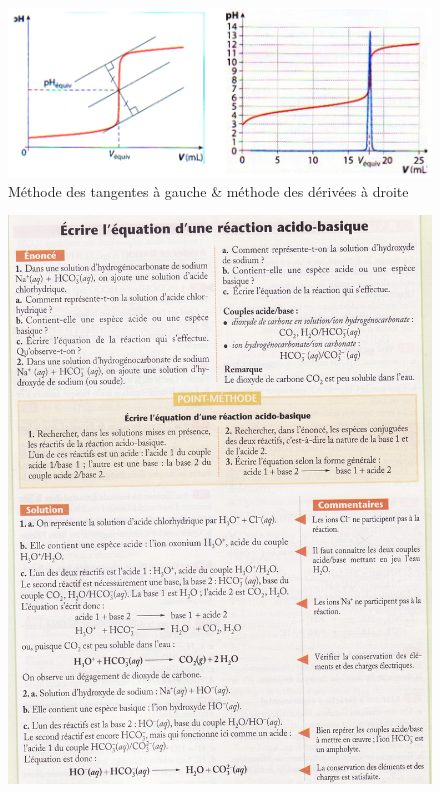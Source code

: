 \documentclass[11pt,a4paper]{article}
\begin{document}
\begin{figure}[h]
    \centering
    \includegraphics[width=\linewidth]{imgs/c3/titreAB.png}
    \caption{Méthode des tangentes à gauche \& méthode des dérivées à droite}
\end{figure}	 

\begin{figure}[h]
    \centering
    \includegraphics[width=\linewidth]{imgs/c3/xo1.jpg}
\end{figure}
\end{document}
